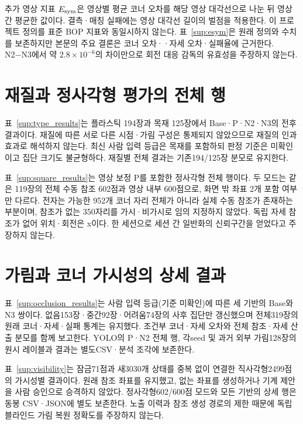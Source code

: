 \documentclass[journal,twoside,web]{ieeecolor}
\begin{document}
추가 영상 지표 $E_{\rm sym}$은 영상별 평균 코너 오차를 해당 영상 대각선으로 나눈 뒤 영상 간 평균한 값이다. 결측·매칭 실패에는 영상 대각선 길이의 벌점을 적용한다. 이 프로젝트 정의를 표준 BOP 지표와 동일시하지 않는다. 표~\ref{sup:esym}은 원래 정의와 수치를 보존하지만 본문의 주요 결론은 코너 오차·\pckten·자세 오차·실패율에 근거한다. N2−N3에서 약 $2.8\times10^{-6}$의 차이만으로 회전 대응 감독의 유효성을 주장하지 않는다.


\section{재질과 정사각형 평가의 전체 행}
표~\ref{sup:type_results}는 플라스틱 194장과 목재 125장에서 Base·P·N2·N3의 전후 결과이다. 재질에 따른 서로 다른 시점·가림 구성은 통제되지 않았으므로 재질의 인과 효과로 해석하지 않는다. 최신 사람 입력 등급은 목재를 포함하되 판정 기준은 미확인이고 집단 크기도 불균형하다. 재질별 전체 결과는 기존194/125장 분모로 유지한다.


표~\ref{sup:square_results}는 영상 보정 P를 포함한 정사각형 전체 행이다. 두 모드는 같은 119장의 전체 수동 참조 602점과 영상 내부 600점으로, 화면 밖 좌표 2개 포함 여부만 다르다. 전자는 가능한 952개 코너 자리 전체가 아니라 실제 수동 참조가 존재하는 부분이며, 참조가 없는 350자리를 가시·비가시로 임의 지정하지 않았다. 독립 자세 참조가 없어 위치·회전은 x이다. 한 세션으로 세션 간 일반화의 신뢰구간을 얻었다고 주장하지 않는다.


\section{가림과 코너 가시성의 상세 결과}
표~\ref{sup:occlusion_results}는 사람 입력 등급(기준 미확인)에 따른 세 기반의 Base와N3 쌍이다. 없음153장·중간92장·어려움74장의 사후 집단만 갱신했으며 전체319장의 원래 코너·자세·실패 통계는 유지했다. 조건부 코너·자세 오차와 전체 참조·자세 산출 분모를 함께 보고한다. YOLO의 P·N2 전체 행, 각seed 및 과거 외부 가림128장의 원시 레이블과 결과는 별도CSV·분석 조각에 보존한다.


표~\ref{sup:visibility}는 잠금71점과 새3030개 상태를 중복 없이 연결한 직사각형2499점의 가시성별 결과이다. 원래 참조 좌표를 유지했고, 없는 좌표를 생성하거나 기계 제안을 사람 승인으로 승격하지 않았다. 정사각형602/600점 모드와 모든 기반의 상세 행은 동봉 CSV·JSON에 별도 보존한다. 노출 이력과 참조 생성 경로의 제한 때문에 독립 블라인드 가림 복원 정확도를 주장하지 않는다.


\end{document}
